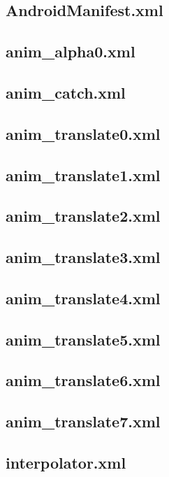 \documentclass[11pt,a4j]{jarticle}
\begin{document}
\subsection{AndroidManifest.xml}
	
	\newpage
\subsection{anim\_alpha0.xml}
	
	\newpage
\subsection{anim\_catch.xml}
	
	\newpage
\subsection{anim\_translate0.xml}
	
	\newpage
\subsection{anim\_translate1.xml}
	
	\newpage
\subsection{anim\_translate2.xml}
	
	\newpage
\subsection{anim\_translate3.xml}
	
	\newpage
\subsection{anim\_translate4.xml}
	
	\newpage
\subsection{anim\_translate5.xml}
	
	\newpage
\subsection{anim\_translate6.xml}
	
	\newpage
\subsection{anim\_translate7.xml}
	
	\newpage
\subsection{interpolator.xml}
	
	\newpage
	
\end{document}
